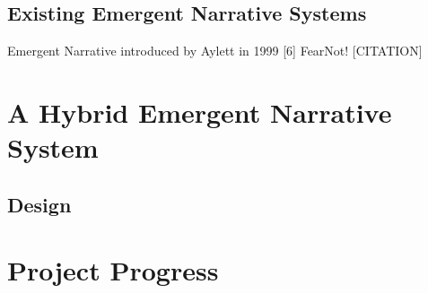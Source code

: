 \documentclass{sig-alternate-05-2015}
\begin{document}
\subsection{Existing Emergent Narrative Systems}
Emergent Narrative introduced by Aylett in 1999 [6]
FearNot! [CITATION]

\section{A Hybrid Emergent Narrative System}
\subsection{Design}

\section{Project Progress}

\newpage
{}
\end{document}
